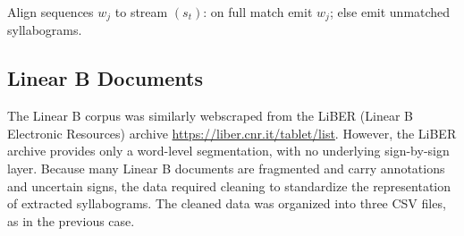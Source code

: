\begin{algorithm}[H]
\DontPrintSemicolon
\SetAlgoNoLine




\caption{Align sequences $w_j$ to stream $(s_t)$: on full match emit $w_j$; else emit unmatched syllabograms.}
\label{alg:la-reconstruct}
\end{algorithm}

\subsection{Linear B Documents}
The Linear B corpus was similarly webscraped from the LiBER (Linear B Electronic Resources) archive \url{https://liber.cnr.it/tablet/list}.
However, the LiBER archive provides only a word-level segmentation, with no underlying sign-by-sign layer.
Because many Linear B documents are fragmented and carry annotations and uncertain signs, the data required cleaning to standardize the representation of extracted syllabograms.
The cleaned data was organized into three CSV files, as in the previous case.

